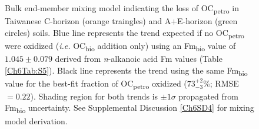 \begin{figure}[t]
	\caption[Bulk $\Delta$OC vs. Fm mixing plot]{Bulk end-member mixing model indicating the loss of OC\textsubscript{petro} in Taiwanese C-horizon (orange traingles) and A+E-horizon (green circles) soils. Blue line represents the trend expected if no OC\textsubscript{petro} were oxidized (\textit{i.e.} OC\textsubscript{bio} addition only) using an Fm\textsubscript{bio} value of $1.045 \pm 0.079$ derived from \textit{n}-alkanoic acid Fm values (Table \ref{Ch6Tab:S5}). Black line represents the trend using the same Fm\textsubscript{bio} value for the best-fit fraction of OC\textsubscript{petro} oxidized ($73^{+2}_{-3}$\%; RMSE $= 0.22$). Shading region for both trends is $\pm 1\sigma$ propagated from Fm\textsubscript{bio} uncertainty. See Supplemental Discussion \ref{Ch6SD4} for mixing model derivation.}
	\label{Ch6Fig:1} 
\end{figure}

